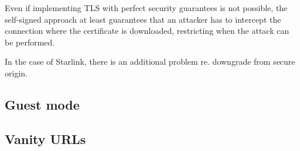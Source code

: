 Even if implementing TLS with perfect security guarantees is not possible, the self-signed approach at least guarantees that an attacker has to intercept the connection where the certificate is downloaded, restricting when the attack can be performed.

In the case of Starlink, there is an additional problem re. downgrade from secure origin.

\subsection{Guest mode}

\subsection{Vanity URLs}


\begin{comment}
  Edd's notes:

Related work:

Zoom exploit, hitting services running on the local network

https://developer.mozilla.org/en-US/docs/Web/Security/Same-origin_policy
"Cross-origin writes are typically allowed"

https://bugzilla.mozilla.org/show_bug.cgi?id=629094
https://www.grepular.com/Abusing_HTTP_Status_Codes_to_Expose_Private_Information
HTTP status code abuse to extract information cross-origin

https://bugzilla.mozilla.org/show_bug.cgi?id=354493
Zoom videoconferencing problem

https://bugzilla.mozilla.org/show_bug.cgi?id=371598
Drive-by pharming through browsers


Security constraints:

Defeating drive-by javascript:
unencrypted passwords prevents silent drive-by javascript, potentially
websites can still brute force or phish the password from you
some sort of CSRF token from my.starlink.com?

Defeating spoofing my.starlink.com:
Vulnerable: because it's using plaintext http
Reason: you can't make a request to an insecure origin from a secure origin (need citation)
use https
passwords prevent silently changing the dish

Attackers on local network:

HSTS could be used with TLS to secure this
CSRF tokens

%


\end{comment}
